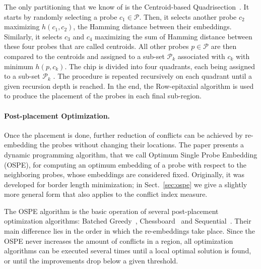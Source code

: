 \documentclass{llncs}
\newcommand{\ignore}[1]{}
\begin{document}
The only partitioning that we know of is the Centroid-based
Quadrisection~\cite{KAHNG03B}. It starts by randomly selecting a probe
$c_1 \in \mathcal{P}$. Then, it selects another probe $c_2$ maximizing
$h(c_1,c_2)$, the Hamming distance between their embeddings. Similarly, it
selects $c_3$ and $c_4$ maximizing the sum of Hamming distance between these
four probes that are called centroids. All other probes $p \in \mathcal{P}$
are then compared to the centroids and assigned to a sub-set $\mathcal{P}_k$
associated with $c_k$ with minimum $h(p,c_k)$. The chip is divided into four
quadrants, each being assigned to a sub-set $\mathcal{P}_k$ .  The procedure
is repeated recursively on each quadrant until a given recursion depth is
reached. In the end, the Row-epitaxial algorithm is used to produce the
placement of the probes in each final sub-region.


\paragraph{Post-placement Optimization.}
Once the placement is done, further reduction of conflicts can be achieved by
re-embedding the probes without changing their locations.  The paper
\cite{KAHNG02} presents a dynamic programming algorithm, that we call Optimum
Single Probe Embedding (OSPE), for computing an optimum embedding of a probe
with respect to the neighboring probes, whose
embeddings are considered fixed.  Originally, it was developed for border
length minimization; in Sect.~\ref{sec:ospe} we give a slightly more
general form that also applies to the conflict index measure.

The OSPE algorithm is the basic operation of several post-placement
optimization algorithms: Batched Greedy~\cite{KAHNG02},
Chessboard~\cite{KAHNG02} and Sequential~\cite{KAHNG03B}. Their main
difference lies in the order in which the re-embeddings take place.
Since the OSPE never increases the amount of conflicts in a region, all
optimization algorithms can be executed several times until a local
optimal solution is found, or until the improvements drop below a given
threshold.

\ignore{ The first algorithm is a simple greedy approach that computes, for
  each spot of the chip, the maximum reduction of conflicts that could be
  achieved by re-embedding its probe with the OSPE algorithm. It then greedily
  selects the spot with higher gain and re-embeds its probe optimally with
  respect to its neighbors, updating the gains of affected spots. A faster
  version, called Batched Greedy, sacrifices its greedy nature by postponing
  the update of gains and re-embedding all probes that have not been affected
  by the re-embeddings performed in the current iteration.
  
  The Chessboard optimization is based on the fact that a chip can be
  bi-colored just like a chessboard, in such a way that the embeddings of
  probes located on white spots, with respect to border length, are
  independent of those placed on black spots, and vice-versa. The Chessboard
  uses this coloring to alternate the optimal re-embedding of probes located
  on black and white spots.%
}
\end{document}
